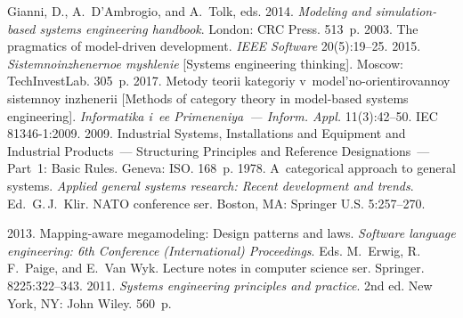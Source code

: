 






  \begin{multicols}{2}

\renewcommand{\bibname}{\protect\rmfamily References}

{\small\frenchspacing
 {%
 \begin{thebibliography}{99} 
Gianni, D., A.~D'Ambrogio, and A.~Tolk, eds. 2014. \textit{Modeling and simulation-based 
systems engineering handbook}. London: CRC Press. 513~p.
 2003. The pragmatics of model-driven development. \textit{IEEE Software} 
20(5):19--25.
 2015. \textit{Sistemnoinzhenernoe myshlenie} [Systems engineering 
thinking]. Moscow: TechInvestLab. 305~p.
 2017. Metody teorii kategoriy v~model'no-orientirovannoy sistemnoy 
inzhenerii [Methods of category theory in model-based systems engineering]. \textit{Informatika 
i~ee Primeneniya~--- Inform. Appl.} 11(3):42--50.
IEC 81346-1:2009. 2009. Industrial Systems, Installations and Equipment and Industrial  
Products~--- Structuring Principles and Reference Designations~--- Part~1: Basic Rules. Geneva: 
ISO. 168~p.
 1978. A~categorical approach to general systems. 
\textit{Applied general systems research: Recent development and trends}. Ed.\ 
G.\,J.~Klir. NATO conference ser. Boston, MA: Springer U.S. 5:257--270.

 2013. Mapping-aware megamodeling: Design 
patterns and laws. 
\textit{Software language engineering: 6th Conference (International) 
Proceedings}. Eds. M.~Erwig, R.\,F.~Paige, and E.~Van Wyk. Lecture notes in computer science 
ser. Springer. 8225:322--343.
 2011. \textit{Systems 
engineering principles and practice}. 2nd ed. New York, NY: John Wiley. 560~p.


\end{thebibliography}}}
\end{multicols}
